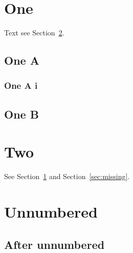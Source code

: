 
\section{One}\label{sec:one}
Text see Section~\ref{sec:two}.
\subsection{One A}
\subsubsection{One A i}
\subsection{One B}
\section{Two}\label{sec:two}
See Section~\ref{sec:one} and Section~\ref{sec:missing}.
\section*{Unnumbered}
\subsection{After unnumbered}

